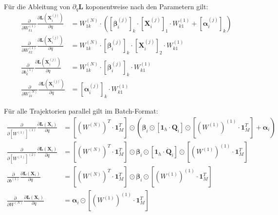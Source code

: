 \documentclass[a4paper, 12pt]{scrartcl}
\begin{document}
Für die Ableitung von $\partial_{q} \bm{L}$ koponentweise nach den Parametern gilt: 
\begin{align*}
    \frac{\partial}{\partial W_{k1}^{(1)}} \frac{\partial \bm{L}(\bm{X}_i^{(j)})}{\partial q}
    &=
    W^{(N)}_{1k} \cdot 
    \left(
        \left[\bm{\beta}_i^{(j)}\right]_k
        \cdot
        \left[\bm{X}_i^{(j)}\right]_1 
        \cdot 
        W^{(1)}_{k1} 
        +
        \left[\bm{\alpha}_i^{(j)}\right]_k
    \right)
    \\
    \frac{\partial}{\partial W_{k2}^{(1)}} \frac{\partial \bm{L}(\bm{X}_i^{(j)})}{\partial q}
    &=
    W^{(N)}_{1k} \cdot \left[\bm{\beta}_i^{(j)}\right]_k \cdot \left[\bm{X}_i^{(j)} \right]_2 \cdot  W^{(1)}_{k1}
    \\
    \frac{\partial}{\partial b_{k}^{(1)}} \frac{\partial \bm{L}(\bm{X}_i^{(j)})}{\partial q}
    &=
    W^{(N)}_{1k} \cdot \left[\bm{\beta}_i^{(j)}\right]_k \cdot W^{(1)}_{k1}
    \\
    \frac{\partial}{\partial W_{1k}^{(N)}} \frac{\partial \bm{L}(\bm{X}_i^{(j)})}{\partial q}
    &=
    \left[\bm{\alpha}_i^{(j)}\right]_k \cdot W_{k1}^{(1)}
\end{align*}

Für alle Trajektorien parallel gilt im Batch-Format:
\begin{align*}
    \frac{\partial}{\partial \left[W^{(1)}\right]^{(1)}} \frac{\partial \bm{L}(\bm{X}_i)}{\partial q}
    &= 
    \left[\left(W^{(N)} \right)^T \cdot \bm{1}_M^T\right] 
    \odot 
    \left(
        \bm{\beta}_i 
        \odot
        \left[\bm{1}_h \cdot \bm{Q}_i\right]
        \odot
        \left[
            \left(W^{(1)}\right)^{(1)}
            \cdot 
            \bm{1}_M^T
        \right]
        +
        \bm{\alpha}_i
    \right)
    \\
    \frac{\partial}{\partial \left[W^{(1)}\right]^{(2)}} \frac{\partial \bm{L}(\bm{X}_i)}{\partial q}
    &=
    \left[\left(W^{(N)} \right)^T \cdot \bm{1}_M^T\right]
    \odot 
    \bm{\beta}_i 
    \odot
    \left[\bm{1}_h \cdot \bm{\dot{Q}}_i\right]
    \odot
    \left[
        \left(W^{(1)}\right)^{(1)}
        \cdot 
        \bm{1}_M^T
    \right]
    \\
    \frac{\partial}{\partial b^{(1)}} \frac{\partial \bm{L}(\bm{X}_i)}{\partial q}
    &=
    \left[\left(W^{(N)} \right)^T \cdot \bm{1}_M^T\right]
    \odot
    \bm{\beta}_i 
    \odot
    \left[
        \left(W^{(1)}\right)^{(1)}
        \cdot 
        \bm{1}_M^T
    \right]
    \\
    \frac{\partial}{\partial W^{(N)}} \frac{\partial \bm{L}(\bm{X}_i)}{\partial q}
    &=
    \bm{\alpha}_i 
    \odot 
    \left[
        \left(W^{(1)}\right)^{(1)}
        \cdot 
        \bm{1}_M^T
    \right]
\end{align*}
\end{document}
